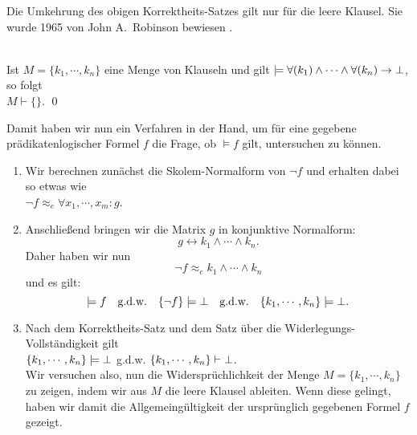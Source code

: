 \noindent
Die Umkehrung des obigen Korrektheits-Satzes gilt nur für die leere Klausel.  Sie wurde 1965 von John
A.~Robinson bewiesen \cite{robinson:1965}.
\begin{Satz}
   \hspace*{\fill} \\
  Ist $M = \{k_1,\cdots,k_n\}$ eine Menge von Klauseln und gilt 
  $\models \forall(k_1) \wedge \cdots \wedge \forall(k_n) \rightarrow \bot$, so folgt \\[0.2cm]
  \hspace*{1.3cm} $M \vdash \{\}$.
    \qed
\end{Satz}
\noindent
Damit haben wir nun ein Verfahren in der Hand, um für eine gegebene 
prädikatenlogischer Formel $f$ die Frage, ob $\models f$ gilt, untersuchen zu können.
\begin{enumerate}
\item Wir berechnen zunächst die Skolem-Normalform von $\neg f$ und erhalten dabei so etwas wie \\[0.2cm]
      \hspace*{1.3cm} $\neg f \approx_e \forall x_1, \cdots, x_m \colon g$.
\item Anschließend bringen wir die Matrix $g$ in konjunktive Normalform: 
      \[ g \leftrightarrow k_1 \wedge \cdots \wedge k_n. \]
      Daher haben wir nun 
      \[ \neg f \approx_e k_1 \wedge \cdots \wedge k_n \] 
      und es gilt: 
      \[  
          \models f                           \quad \mbox{g.d.w.} \quad
          \{\neg f\} \models \bot          \quad \mbox{g.d.w.} \quad 
          \{k_1,\cdots,k_n\} \models \bot.
      \]
\item Nach dem Korrektheits-Satz und dem Satz über die Widerlegungs-Vollständigkeit gilt
      \\[0.2cm]
      \hspace*{1.3cm} 
      $\{k_1,\cdots,k_n\} \models \bot$ \quad g.d.w. \quad 
      $\{k_1,\cdots,k_n\} \vdash \bot$. \\[0.2cm]
      Wir versuchen also, nun die Widersprüchlichkeit der Menge $M = \{ k_1, \cdots, k_n \}$  zu zeigen, indem wir
      aus $M$ die leere Klausel ableiten.
      Wenn diese gelingt, haben wir damit die Allgemeingültigkeit der ursprünglich
      gegebenen Formel $f$ gezeigt.
\end{enumerate}

